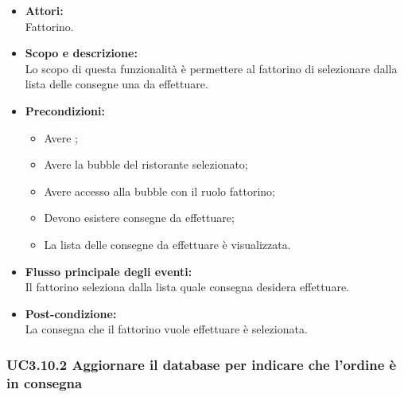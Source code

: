 \begin{itemize}
	\item \textbf{Attori:}
	\\Fattorino.
	\item \textbf{Scopo e descrizione:} 
	\\Lo scopo di questa funzionalità è permettere al fattorino di selezionare dalla lista delle consegne una da effettuare.
	\item \textbf{Precondizioni:}
	\begin{itemize}
		\item Avere ;
		\item Avere la bubble del ristorante selezionato;
		\item Avere accesso alla bubble con il ruolo fattorino;
		\item Devono esistere consegne da effettuare;
		\item La lista delle consegne da effettuare è visualizzata.
	\end{itemize}
	\item \textbf{Flusso principale degli eventi:}
	\\Il fattorino seleziona dalla lista quale consegna desidera effettuare.
	\item \textbf{Post-condizione:}
	\\La consegna che il fattorino vuole effettuare è selezionata.
\end{itemize}

\subsubsection{UC3.10.2 Aggiornare il database per indicare che l’ordine è in consegna} \label{UC3.10.2}

